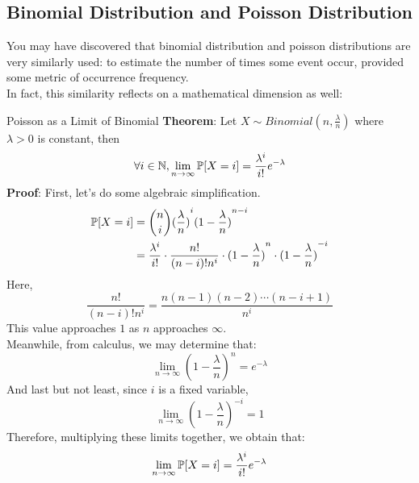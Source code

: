 \subsection{Binomial Distribution and Poisson Distribution}
You may have discovered that binomial distribution and poisson distributions are very similarly used: to estimate the number of times some event occur, provided some metric of occurrence frequency. \\
In fact, this similarity reflects on a mathematical dimension as well:
\begin{ln-theorem}{Poisson as a Limit of Binomial}{}
    \textbf{Theorem}: Let $X \sim Binomial(n, \frac{\lambda}{n})$ where $\lambda > 0$ is constant, then
    \[\forall i \in \N, \lim_{n \rightarrow \infty}\P[X = i] = \frac{\lambda^i}{i!}e^{-\lambda}\]
    \tcblower
    \textbf{Proof}:
    First, let's do some algebraic simplification.
    \begin{align*}
        \P[X = i]
        &= \binom{n}{i} {(\frac{\lambda}{n})}^i {(1 - \frac{\lambda}{n})}^{n - i} \\
        &= \frac{\lambda^i}{i!} \cdot \frac{n!}{(n - i)! n^i} \cdot {(1 - \frac{\lambda}{n})}^{n} \cdot {(1 - \frac{\lambda}{n})}^{-i}
    \end{align*}
    Here,
    \[\frac{n!}{(n - i)! n^i} = \frac{n (n - 1) (n - 2) \cdots (n - i + 1)}{n^i}\]
    This value approaches $1$ as $n$ approaches $\infty$. \\
    Meanwhile, from calculus, we may determine that:
    \[\lim_{n \rightarrow \infty} {(1 - \frac{\lambda}{n})}^n = e^{-\lambda}\]
    And last but not least, since $i$ is a fixed variable,
    \[\lim_{n \rightarrow \infty} {(1 - \frac{\lambda}{n})}^{-i} = 1\]
    Therefore, multiplying these limits together, we obtain that:
    \[\lim_{n \rightarrow \infty} \P[X = i] = \frac{\lambda^i}{i!}e^{-\lambda}\]
\end{ln-theorem}

